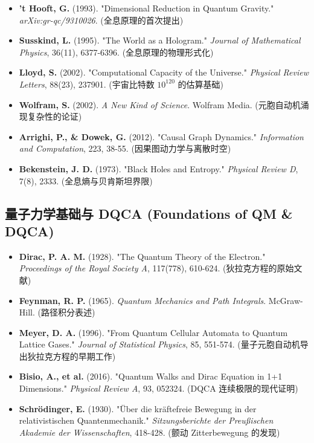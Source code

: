 \begin{itemize}
\item \textbf{'t Hooft, G.} (1993). "Dimensional Reduction in Quantum Gravity." \textit{arXiv:gr-qc/9310026}. (全息原理的首次提出)
\item \textbf{Susskind, L.} (1995). "The World as a Hologram." \textit{Journal of Mathematical Physics}, 36(11), 6377-6396. (全息原理的物理形式化)
\item \textbf{Lloyd, S.} (2002). "Computational Capacity of the Universe." \textit{Physical Review Letters}, 88(23), 237901. (宇宙比特数 $10^{120}$ 的估算基础)
\item \textbf{Wolfram, S.} (2002). \textit{A New Kind of Science}. Wolfram Media. (元胞自动机涌现复杂性的论证)
\item \textbf{Arrighi, P., \& Dowek, G.} (2012). "Causal Graph Dynamics." \textit{Information and Computation}, 223, 38-55. (因果图动力学与离散时空)
\item \textbf{Bekenstein, J. D.} (1973). "Black Holes and Entropy." \textit{Physical Review D}, 7(8), 2333. (全息熵与贝肯斯坦界限)
\end{itemize}

\subsection{量子力学基础与 DQCA (Foundations of QM \& DQCA)}

\begin{itemize}
\item \textbf{Dirac, P. A. M.} (1928). "The Quantum Theory of the Electron." \textit{Proceedings of the Royal Society A}, 117(778), 610-624. (狄拉克方程的原始文献)
\item \textbf{Feynman, R. P.} (1965). \textit{Quantum Mechanics and Path Integrals}. McGraw-Hill. (路径积分表述)
\item \textbf{Meyer, D. A.} (1996). "From Quantum Cellular Automata to Quantum Lattice Gases." \textit{Journal of Statistical Physics}, 85, 551-574. (量子元胞自动机导出狄拉克方程的早期工作)
\item \textbf{Bisio, A., et al.} (2016). "Quantum Walks and Dirac Equation in 1+1 Dimensions." \textit{Physical Review A}, 93, 052324. (DQCA 连续极限的现代证明)
\item \textbf{Schrödinger, E.} (1930). "Über die kräftefreie Bewegung in der relativistischen Quantenmechanik." \textit{Sitzungsberichte der Preußischen Akademie der Wissenschaften}, 418-428. (颤动 Zitterbewegung 的发现)
\end{itemize}

